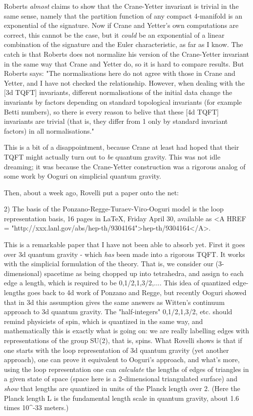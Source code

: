 Roberts \emph{almost} claims to show that the Crane-Yetter invariant is
trivial in the same sense, namely that the partition function of any
compact 4-manifold is an exponential of the signature.  Now if Crane and
Yetter's own computations are correct, this cannot be the case, but it
\emph{could} be an exponential of a linear combination of the signature and
the Euler characteristic, as far as I know.  The catch is that Roberts
does not normalize his version of the Crane-Yetter invariant in the same
way that Crane and Yetter do, so it is hard to compare results.  But
Roberts says: "The normalisations here do not agree with those in Crane
and Yetter, and I have not checked the relationship.  However, when
dealing with the [3d TQFT] invariants, different normalisations of the
initial data change the invariants by factors depending on standard
topological invariants (for example Betti numbers), so there is every
reason to belive that these [4d TQFT] invariants are trivial (that is,
they differ from 1 only by standard invariant factors) in all
normalisations."  

This is a bit of a disappointment, because Crane at least had hoped that
their TQFT might actually turn out to \emph{be} quantum gravity.  This was
not idle dreaming; it was because the Crane-Yetter construction was a
rigorous analog of some work by Ooguri on simplicial quantum gravity.  


Then, about a week ago, Rovelli put a paper onto the net:

2) The basis of the Ponzano-Regge-Turaev-Viro-Ooguri model is the loop
representation basis, 16 pages in LaTeX, Friday April 30, available as
<A HREF = "http://xxx.lanl.gov/abs/hep-th/9304164">hep-th/9304164</A>. 

This is a remarkable paper that I have not been able to absorb yet.
First it goes over 3d quantum gravity - which \emph{has} been made into a
rigorous TQFT.  It works with the simplicial formulation of the theory.
That is, we consider our (3-dimensional) spacetime as being chopped up
into tetrahedra, and assign to each edge a length, which is required to
be 0,1/2,1,3/2,....  This idea of quantized edge-lengths goes back to
4d work of Ponzano and Regge, but recently Ooguri showed that in 3d
this assumption gives the same answers as Witten's continuum approach to
3d quantum gravity.  The "half-integers" 0,1/2,1,3/2, etc. should remind
physicists of spin, which is quantized in the same way, and
mathematically this is exactly what is going on: we are really labelling
edges with representations of the group SU(2), that is, spins.  What
Rovelli shows is that if one starts with the loop representation of 3d
quantum gravity (yet another approach), one can prove it equivalent to
Ooguri's approach, and what's more, using the loop representation one
can \emph{calculate} the lengths of edges of triangles in a given state of
space (space here is a 2-dimensional triangulated surface) and \emph{show}
that lengths are quantized in units of the Planck length over 2.  (Here
the Planck length L is the fundamental length scale in quantum gravity,
about 1.6 times 10^{-33} meters.)  

